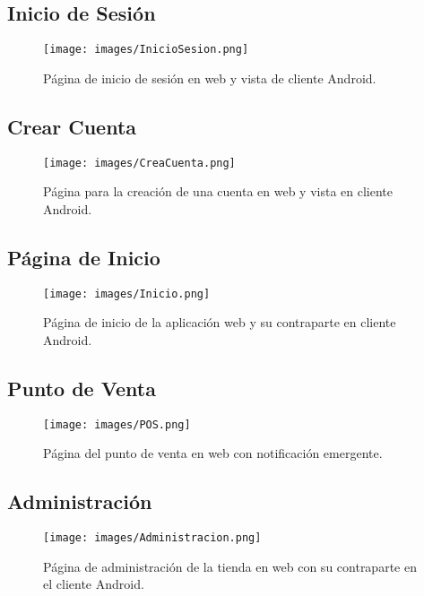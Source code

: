 \subsection{Inicio de Sesión}

\begin{figure}[H]
    \texttt{[image: images/InicioSesion.png]}
    \centering
    \caption{Página de inicio de sesión en web y vista de cliente Android.}
\end{figure}

\subsection{Crear Cuenta}

\begin{figure}[H]
    \texttt{[image: images/CreaCuenta.png]}
    \centering
    \caption{Página para la creación de una cuenta en web y vista en cliente Android.}
\end{figure}

\subsection{Página de Inicio}

\begin{figure}[H]
    \texttt{[image: images/Inicio.png]}
    \centering
    \caption{Página de inicio de la aplicación web y su contraparte en cliente Android.}
\end{figure}

\subsection{Punto de Venta}

\begin{figure}[H]
    \texttt{[image: images/POS.png]}
    \centering
    \caption{Página del punto de venta en web con notificación emergente.}
\end{figure}

\subsection{Administración}

\begin{figure}[H]
    \texttt{[image: images/Administracion.png]}
    \centering
    \caption{Página de administración de la tienda en web con su contraparte en el cliente Android.}
\end{figure}

